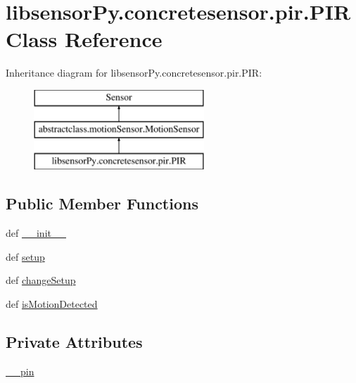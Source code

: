 \hypertarget{classlibsensorPy_1_1concretesensor_1_1pir_1_1PIR}{}\section{libsensor\+Py.\+concretesensor.\+pir.\+P\+I\+R Class Reference}
\label{classlibsensorPy_1_1concretesensor_1_1pir_1_1PIR}
Inheritance diagram for libsensor\+Py.\+concretesensor.\+pir.\+P\+I\+R\+:\begin{figure}[H]
\begin{center}
\leavevmode
\includegraphics[height=3.000000cm]{classlibsensorPy_1_1concretesensor_1_1pir_1_1PIR}
\end{center}
\end{figure}
\subsection*{Public Member Functions}
\begin{DoxyCompactItemize}
\item 
def \hyperlink{classlibsensorPy_1_1concretesensor_1_1pir_1_1PIR_a7774c7f7f0d60bafef9cd58eb2d42299}{\+\_\+\+\_\+init\+\_\+\+\_\+}
\item 
def \hyperlink{classlibsensorPy_1_1concretesensor_1_1pir_1_1PIR_abadb44be9a54d7bd4844910aa6964e43}{setup}
\item 
def \hyperlink{classlibsensorPy_1_1concretesensor_1_1pir_1_1PIR_a3e7d9cc7c1975c6cec5d11765b1a9b7e}{change\+Setup}
\item 
def \hyperlink{classlibsensorPy_1_1concretesensor_1_1pir_1_1PIR_a5f58ff688b562fd994b2b4762ee3b83e}{is\+Motion\+Detected}
\end{DoxyCompactItemize}
\subsection*{Private Attributes}
\begin{DoxyCompactItemize}
\item 
\hyperlink{classlibsensorPy_1_1concretesensor_1_1pir_1_1PIR_a1eb2c5437661fbf2ab10226e8be9c2b3}{\+\_\+\+\_\+pin}
\end{DoxyCompactItemize}


